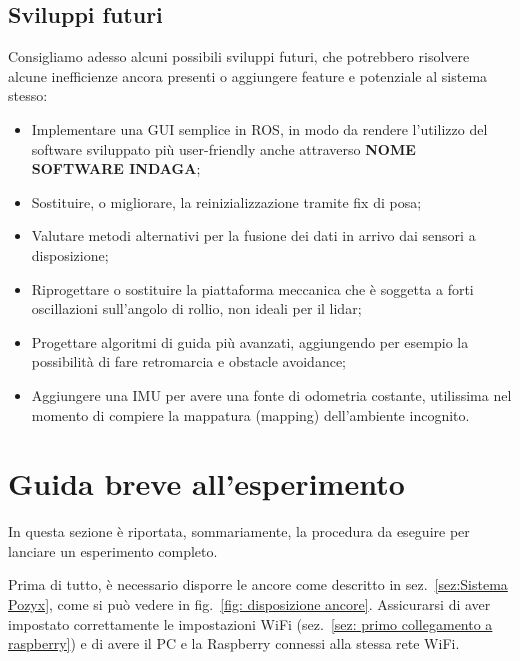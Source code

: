 \subsection{Sviluppi futuri}
Consigliamo adesso alcuni possibili sviluppi futuri, che potrebbero risolvere alcune inefficienze ancora presenti o aggiungere feature e potenziale al sistema stesso:
\begin{itemize}
    \item Implementare una GUI semplice in ROS, in modo da rendere l’utilizzo del software sviluppato più user-friendly anche attraverso \textbf{NOME SOFTWARE INDAGA};
    
    \item Sostituire, o migliorare, la reinizializzazione tramite fix di posa;
    
    \item Valutare metodi alternativi per la fusione dei dati in arrivo dai sensori a disposizione;
    
    \item Riprogettare o sostituire la piattaforma meccanica che \`e soggetta a forti oscillazioni sull'angolo di rollio, non ideali per il lidar;
    
    \item Progettare algoritmi di guida pi\`u avanzati, aggiungendo per esempio la possibilit\`a di fare retromarcia e obstacle avoidance;
    
    \item Aggiungere una IMU per avere una fonte di odometria costante, utilissima nel momento di compiere la mappatura (mapping) dell'ambiente incognito.
\end{itemize}



\newpage
\section{Guida breve all'esperimento}
\label{sez: Guida breve all'esperimento}
In questa sezione è riportata, sommariamente, la procedura da eseguire per lanciare un esperimento completo.

Prima di tutto, è necessario disporre le ancore come descritto in sez.~\ref{sez:Sistema Pozyx}, come si può vedere in fig.~\ref{fig: disposizione ancore}. 
Assicurarsi di aver impostato correttamente le impostazioni WiFi (sez.~\ref{sez: primo collegamento a raspberry}) e di avere il PC e la Raspberry connessi 
alla stessa rete WiFi.



